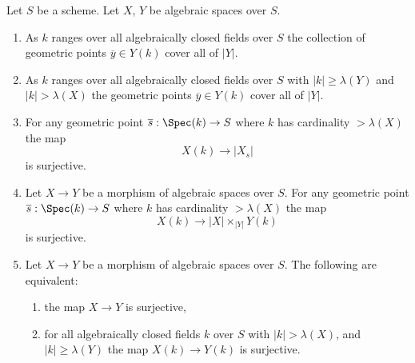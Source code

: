 \begin{lemma}
\label{lemma-large-enough}
Let $S$ be a scheme. Let $X$, $Y$ be algebraic spaces over $S$.
\begin{enumerate}
\item As $k$ ranges over all algebraically closed fields over $S$
the collection of geometric points $\overline{y} \in Y(k)$ cover all of $|Y|$.
\item As $k$ ranges over all algebraically closed fields over $S$ with
$|k| \geq \lambda(Y)$ and $|k| > \lambda(X)$ the geometric points
$\overline{y} \in Y(k)$ cover all of $|Y|$.
\item For any geometric point
$\overline{s} : \Spec(k) \to S$ where
$k$ has cardinality $> \lambda(X)$ the map
$$
X(k) \longrightarrow |X_s|
$$
is surjective.
\item Let $X \to Y$ be a morphism of algebraic spaces over $S$.
For any geometric point $\overline{s} : \Spec(k) \to S$ where
$k$ has cardinality $> \lambda(X)$ the map
$$
X(k) \longrightarrow |X| \times_{|Y|} Y(k)
$$
is surjective.
\item Let $X \to Y$ be a morphism of algebraic spaces over $S$.
The following are equivalent:
\begin{enumerate}
\item the map $X \to Y$ is surjective,
\item for all algebraically closed fields $k$ over $S$ with
$|k| > \lambda(X)$, and $|k| \geq \lambda(Y)$ the map $X(k) \to Y(k)$
is surjective.
\end{enumerate}
\end{enumerate}
\end{lemma}

